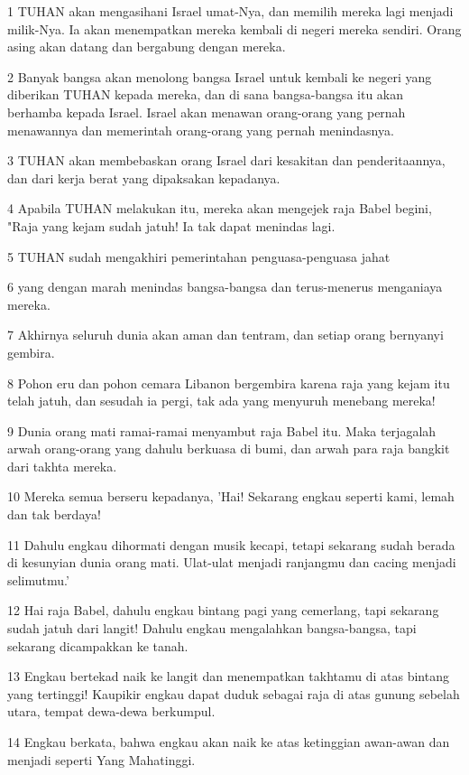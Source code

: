 \par 1 TUHAN akan mengasihani Israel umat-Nya, dan memilih mereka lagi menjadi milik-Nya. Ia akan menempatkan mereka kembali di negeri mereka sendiri. Orang asing akan datang dan bergabung dengan mereka.
\par 2 Banyak bangsa akan menolong bangsa Israel untuk kembali ke negeri yang diberikan TUHAN kepada mereka, dan di sana bangsa-bangsa itu akan berhamba kepada Israel. Israel akan menawan orang-orang yang pernah menawannya dan memerintah orang-orang yang pernah menindasnya.
\par 3 TUHAN akan membebaskan orang Israel dari kesakitan dan penderitaannya, dan dari kerja berat yang dipaksakan kepadanya.
\par 4 Apabila TUHAN melakukan itu, mereka akan mengejek raja Babel begini, "Raja yang kejam sudah jatuh! Ia tak dapat menindas lagi.
\par 5 TUHAN sudah mengakhiri pemerintahan penguasa-penguasa jahat
\par 6 yang dengan marah menindas bangsa-bangsa dan terus-menerus menganiaya mereka.
\par 7 Akhirnya seluruh dunia akan aman dan tentram, dan setiap orang bernyanyi gembira.
\par 8 Pohon eru dan pohon cemara Libanon bergembira karena raja yang kejam itu telah jatuh, dan sesudah ia pergi, tak ada yang menyuruh menebang mereka!
\par 9 Dunia orang mati ramai-ramai menyambut raja Babel itu. Maka terjagalah arwah orang-orang yang dahulu berkuasa di bumi, dan arwah para raja bangkit dari takhta mereka.
\par 10 Mereka semua berseru kepadanya, 'Hai! Sekarang engkau seperti kami, lemah dan tak berdaya!
\par 11 Dahulu engkau dihormati dengan musik kecapi, tetapi sekarang sudah berada di kesunyian dunia orang mati. Ulat-ulat menjadi ranjangmu dan cacing menjadi selimutmu.'
\par 12 Hai raja Babel, dahulu engkau bintang pagi yang cemerlang, tapi sekarang sudah jatuh dari langit! Dahulu engkau mengalahkan bangsa-bangsa, tapi sekarang dicampakkan ke tanah.
\par 13 Engkau bertekad naik ke langit dan menempatkan takhtamu di atas bintang yang tertinggi! Kaupikir engkau dapat duduk sebagai raja di atas gunung sebelah utara, tempat dewa-dewa berkumpul.
\par 14 Engkau berkata, bahwa engkau akan naik ke atas ketinggian awan-awan dan menjadi seperti Yang Mahatinggi.

